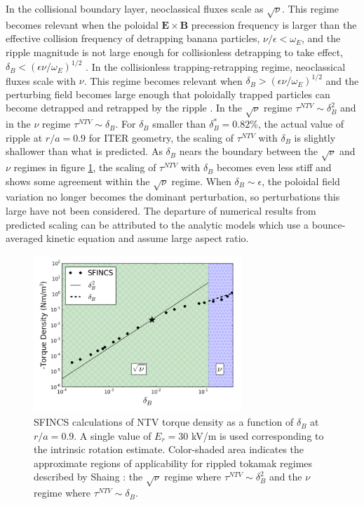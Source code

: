 \documentclass{article}
\numberwithin{figure}{section}
\numberwithin{equation}{section}
\begin{document}
In the collisional boundary layer, neoclassical fluxes scale as $\sqrt{\nu}$. This regime becomes relevant when the poloidal $\bm{E} \times \bm{B}$ precession frequency is larger than the effective collision frequency of detrapping banana particles, $\nu/\epsilon < \omega_E$, and the ripple magnitude is not large enough for collisionless detrapping to take effect, $\delta_B < \left(  \epsilon \nu/\omega_E \right)^{1/2}$ \cite{Shaing2008}. 
In the collisionless trapping-retrapping regime, neoclassical fluxes scale with $\nu$. This regime becomes relevant when $\delta_B > \left(  \epsilon \nu/\omega_E \right)^{1/2}$ and the perturbing field becomes large enough that poloidally trapped particles can become detrapped and retrapped by the ripple \cite{Shaing2010}. In the $\sqrt{\nu}$ regime $\tau^{NTV} \sim \delta_B^2$ and in the $\nu$ regime $\tau^{NTV} \sim \delta_B$. For $\delta_B$ smaller than $\delta_B^* = 0.82\%$, the actual value of ripple at $r/a=0.9$ for ITER geometry, the scaling of $\tau^{NTV}$ with $\delta_B$ is slightly shallower than what is predicted. 
As $\delta_B$ nears the boundary between the $\sqrt{\nu}$ and $\nu$ regimes in figure \ref{fig:scalescan}, the scaling of $\tau^{NTV}$ with $\delta_B$ becomes even less stiff and shows some agreement within the $\sqrt{\nu}$ regime. When $\delta_B \sim \epsilon$, the poloidal field variation no longer becomes the dominant perturbation, so perturbations this large have not been considered. The departure of numerical results from predicted scaling can be attributed to the analytic models which use a bounce-averaged kinetic equation and assume large aspect ratio. 

\begin{figure}[h!]
\centering
\includegraphics[width=0.7\textwidth]
{scalescan.png}
\caption{\label{fig:scalescan} SFINCS calculations of NTV torque density as a function of $\delta_B$ at $r/a = 0.9$. A single value of $E_r = 30$ kV/m is used corresponding to the intrinsic rotation estimate. Color-shaded area indicates the approximate regions of applicability for rippled tokamak regimes described by Shaing \cite{Shaing2010, Shaing2008}: the $\sqrt{\nu}$ regime where $\tau^{NTV} \sim \delta_B^2$ and the $\nu$ regime where $\tau^{NTV} \sim \delta_B$. }
\end{figure} 
\end{document}
